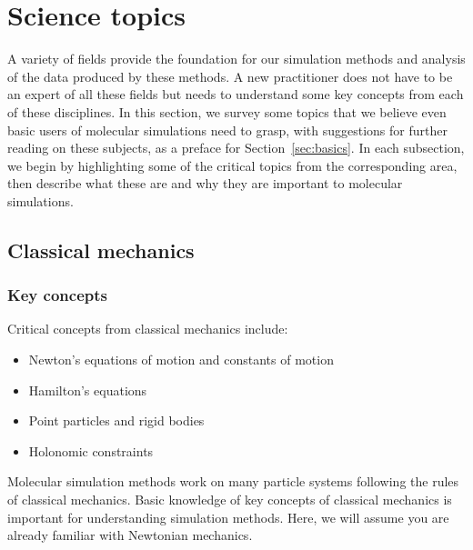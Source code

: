 \documentclass[9pt,bestpractices]{livecoms}
\begin{document}
\section{Science topics}
\label{sec:science}
A variety of fields provide the foundation for our simulation methods and analysis of the data produced by these methods.
A new practitioner does not have to be an expert of all these fields but needs to understand some key concepts from each of these disciplines.
In this section, we survey some topics that we believe even basic users of molecular simulations need to grasp, with suggestions for further reading on these subjects, as a preface for Section~\ref{sec:basics}.
In each subsection, we begin by highlighting some of the critical topics from the corresponding area, then describe what these are and why they are important to molecular simulations.

\subsection{Classical mechanics}
\label{sec:classical_mechanics}
\subsubsection{Key concepts}

Critical concepts from classical mechanics include:
\begin{itemize}
\item Newton's equations of motion and constants of motion
\item Hamilton's equations
\item Point particles and rigid bodies
\item Holonomic constraints
\end{itemize}

Molecular simulation methods work on many particle systems following the rules of classical mechanics. 
Basic knowledge of key concepts of classical mechanics is important for understanding simulation methods.
Here, we will assume you are already familiar with Newtonian mechanics.
\end{document}
